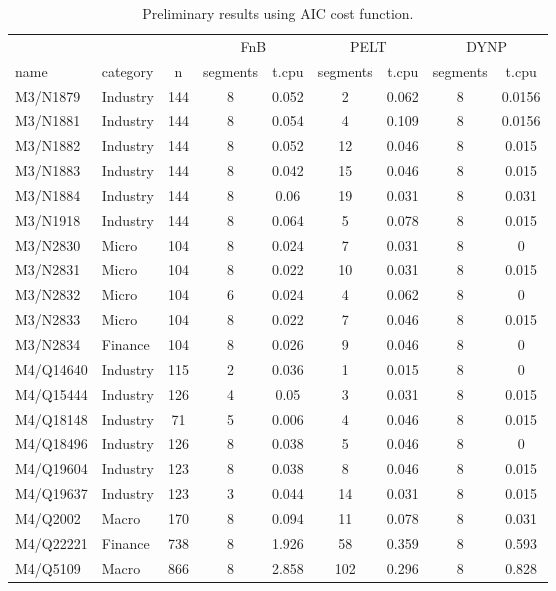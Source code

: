 \documentclass[runningheads]{llncs}
\begin{document}
\begin{table}
	\caption{Preliminary results using AIC cost function.}\label{tab1}
	\begin{tabular}{llc|cc|cc|cc}
		\hline
		& & & \multicolumn{2}{c|}{FnB} & \multicolumn{2}{c|}{PELT} & \multicolumn{2}{c}{DYNP} \\ 
		name & category & n & segments & t.cpu & segments & t.cpu & segments & t.cpu\\ 
		\hline
		M3/N1879  & Industry & 144 & 8 & 0.052 &  2 & 0.062 & 8 & 0.0156\\ 
		M3/N1881  & Industry & 144 & 8 & 0.054 &  4 & 0.109 & 8 & 0.0156\\ 
		M3/N1882  & Industry & 144 & 8 & 0.052 & 12 & 0.046 & 8 & 0.015\\ 
		M3/N1883  & Industry & 144 & 8 & 0.042 & 15 & 0.046 & 8 & 0.015\\ 
		M3/N1884  & Industry & 144 & 8 & 0.06  & 19 & 0.031 & 8 & 0.031\\ 
		M3/N1918  & Industry & 144 & 8 & 0.064 &  5 & 0.078 & 8 & 0.015\\ 
		M3/N2830  &    Micro & 104 & 8 & 0.024 &  7 & 0.031 & 8 & 0\\ 
		M3/N2831  &    Micro & 104 & 8 & 0.022 & 10 & 0.031 & 8 & 0.015\\ 
		M3/N2832  &    Micro & 104 & 6 & 0.024 &  4 & 0.062 & 8 & 0\\ 
		M3/N2833  &    Micro & 104 & 8 & 0.022 &  7 & 0.046 & 8 & 0.015\\ 
		M3/N2834  &  Finance & 104 & 8 & 0.026 &  9 & 0.046 & 8 & 0\\ 
		M4/Q14640 & Industry & 115 & 2 & 0.036 &  1 & 0.015 & 8 & 0\\ 
		M4/Q15444 & Industry & 126 & 4 & 0.05  &  3 & 0.031 & 8 & 0.015\\ 
		M4/Q18148 & Industry &  71 & 5 & 0.006 &  4 & 0.046 & 8 & 0.015\\ 
		M4/Q18496 & Industry & 126 & 8 & 0.038 &  5 & 0.046 & 8 & 0\\ 
		M4/Q19604 & Industry & 123 & 8 & 0.038 &  8 & 0.046 & 8 & 0.015\\ 
		M4/Q19637 & Industry & 123 & 3 & 0.044 & 14 & 0.031 & 8 & 0.015\\ 
		M4/Q2002  &    Macro & 170 & 8 & 0.094 & 11 & 0.078 & 8 & 0.031\\ 
		M4/Q22221 &  Finance & 738 & 8 & 1.926 & 58 & 0.359 & 8 & 0.593\\ 
		M4/Q5109  &    Macro & 866 & 8 & 2.858 &102 & 0.296 & 8 & 0.828\\ 

\end{tabular}
\end{table}
\end{document}
